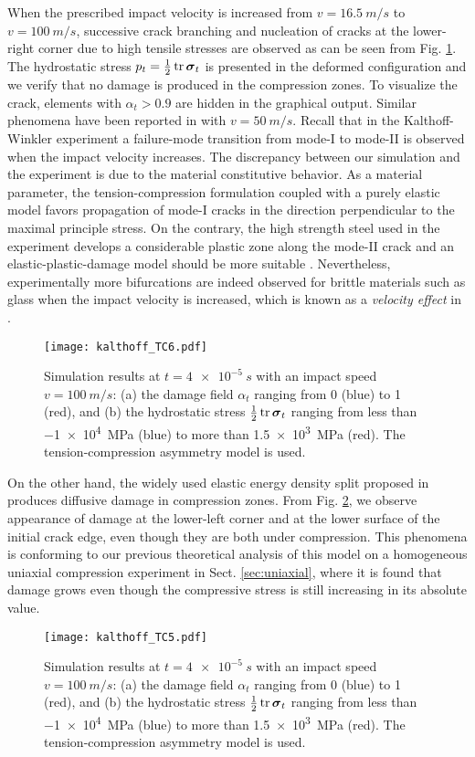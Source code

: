 When the prescribed impact velocity is increased from $v=\SI{16.5}{m/s}$ to $v=\SI{100}{m/s}$, successive crack branching and nucleation of cracks at the lower-right corner due to high tensile stresses are observed as can be seen from Fig. \ref{fig:v1d5}. The hydrostatic stress $p_t=\frac{1}{2}\tr\sig_t$ is presented in the deformed configuration and we verify that no damage is produced in the compression zones. To visualize the crack, elements with $\alpha_t>0.9$ are hidden in the graphical output. Similar phenomena have been reported in \cite{HofackerMiehe:2012} with $v=\SI{50}{m/s}$. Recall that in the Kalthoff-Winkler experiment a failure-mode transition from mode-\RN{1} to mode-\RN{2} is observed when the impact velocity increases. The discrepancy between our simulation and the experiment is due to the material constitutive behavior. As a material parameter, the tension-compression formulation \cite{FreddiRoyer-Carfagni:2010} coupled with a purely elastic model favors propagation of mode-\RN{1} cracks in the direction perpendicular to the maximal principle stress. On the contrary, the high strength steel used in the experiment develops a considerable plastic zone along the mode-\RN{2} crack and an elastic-plastic-damage model should be more suitable \cite{MieheHofackerSchaenzelAldakheel:2015}. Nevertheless, experimentally more bifurcations are indeed observed for brittle materials such as glass when the impact velocity is increased, which is known as a \emph{velocity effect} in \cite{Schardin:2012}.
\begin{figure}[htbp]
\centering
\texttt{[image: kalthoff\_TC6.pdf]}
\caption{Simulation results at $t=\SI{4e-5}{s}$ with an impact speed $v=\SI{100}{m/s}$: (a) the damage field $\alpha_t$ ranging from 0 (blue) to 1 (red), and (b) the hydrostatic stress $\frac{1}{2}\tr\sig_t$ ranging from less than \SI{-1e4}{MPa} (blue) to more than \SI{1.5e3}{MPa} (red). The tension-compression asymmetry model \cite{FreddiRoyer-Carfagni:2010} is used.} \label{fig:v1d5}
\end{figure}

On the other hand, the widely used elastic energy density split proposed in \cite{MieheHofackerWelschinger:2010} produces diffusive damage in compression zones. From Fig. \ref{fig:v1d5_miehe}, we observe appearance of damage at the lower-left corner and at the lower surface of the initial crack edge, even though they are both under compression. This phenomena is conforming to our previous theoretical analysis of this model on a homogeneous uniaxial compression experiment in Sect. \ref{sec:uniaxial}, where it is found that damage grows even though the compressive stress is still increasing in its absolute value.
\begin{figure}[htbp]
\centering
\texttt{[image: kalthoff\_TC5.pdf]}
\caption{Simulation results at $t=\SI{4e-5}{s}$ with an impact speed $v=\SI{100}{m/s}$: (a) the damage field $\alpha_t$ ranging from 0 (blue) to 1 (red), and (b) the hydrostatic stress $\frac{1}{2}\tr\sig_t$ ranging from less than \SI{-1e4}{MPa} (blue) to more than \SI{1.5e3}{MPa} (red). The tension-compression asymmetry model \cite{MieheHofackerWelschinger:2010} is used.} \label{fig:v1d5_miehe}
\end{figure}


